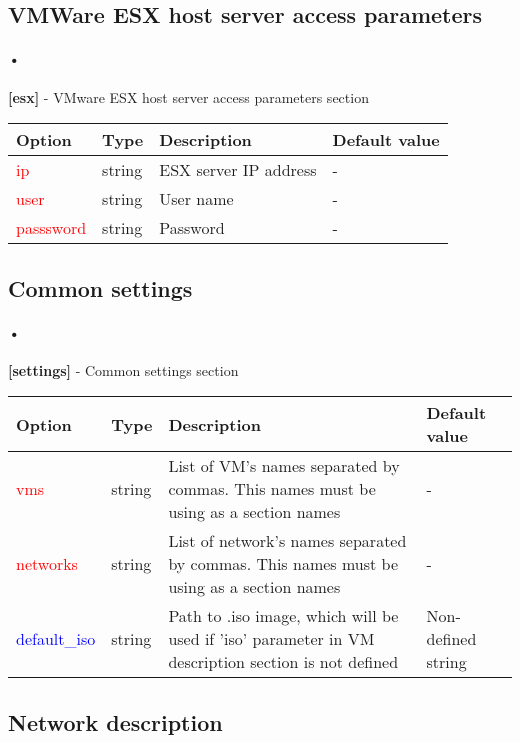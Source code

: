 \documentclass[a4paper,11pt]{article}
\def \frst {2.8cm} %
\def \scnd {1.2cm} %
\def \thrd {8cm}
\def \frth {3cm}
\def \tnamefsrt{\textbf{Option}}
\def \tnamescnd{\textbf{Type}}
\def \tnamethrd{\textbf{Description}}
\def \tnamefrth{\textbf{Default value}}
\let\oldsubsection\subsection
\def\subsection{\subsectionclearpage\let\subsectionclearpage\clearpage\oldsubsection}
\begin{document}
\subsection{VMWare ESX host server access parameters}
\paragraph{•}
\textbf{[esx]} - VMware ESX host server access parameters section\\
\begin{tabular}{p{\frst}|p{\scnd}|p{\thrd}|p{\frth}}
\tnamefsrt 		   		   & \tnamescnd   & \tnamethrd           & \tnamefrth 			\\
\hline
\textcolor{red}{ip}        & string & ESX server IP address & -                       \\
\textcolor{red}{user}      & string & User name             & -                       \\
\textcolor{red}{passsword} & string & Password              & -                       \\
\end{tabular}

\subsection{Common settings}
\paragraph{•}
\textbf{[settings]} - Common settings section\\

\begin{tabular}{p{\frst}|p{\scnd}|p{\thrd}|p{\frth}}
\tnamefsrt 		   		   & \tnamescnd   & \tnamethrd           & \tnamefrth 			\\
\hline
\textcolor{red}{vms}           & string & List of VM's names separated by commas. This names must be using as a section names            & -                       \\
\textcolor{red}{networks}      & string & List of network's names separated by commas. This names must be using as a section names       & -                       \\
\textcolor{blue}{default\_iso} & string & Path to .iso image, which will be used if 'iso' parameter in VM description section is not defined & Non-defined string      \end{tabular}

\subsection{Network description}
\end{document}
